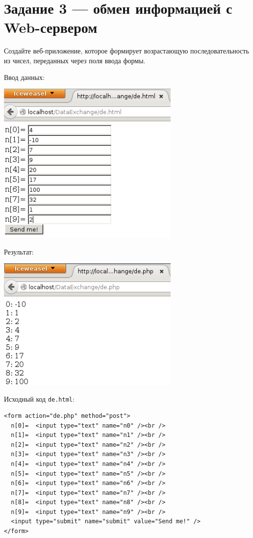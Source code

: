 \section{Задание 3 --- обмен информацией с Web-сервером}

Создайте веб-приложение, которое формирует возрастающую последовательность из чисел, переданных через поля ввода формы.

Ввод данных:

\begin{center}
  \includegraphics[width=9cm]{img/09.png}
\end{center}

Результат:

\begin{center}
  \includegraphics[width=9cm]{img/10.png}
\end{center}

Исходный код \verb|de.html|:

\begin{verbatim}
<form action="de.php" method="post">
  n[0]=  <input type="text" name="n0" /><br />
  n[1]=  <input type="text" name="n1" /><br />
  n[2]=  <input type="text" name="n2" /><br />
  n[3]=  <input type="text" name="n3" /><br />
  n[4]=  <input type="text" name="n4" /><br />
  n[5]=  <input type="text" name="n5" /><br />
  n[6]=  <input type="text" name="n6" /><br />
  n[7]=  <input type="text" name="n7" /><br />
  n[8]=  <input type="text" name="n8" /><br />
  n[9]=  <input type="text" name="n9" /><br />
  <input type="submit" name="submit" value="Send me!" />
</form>
\end{verbatim}

